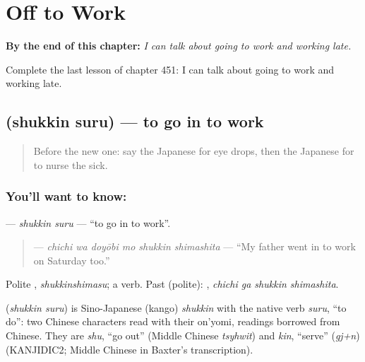 
\chapter{Off to Work}
\label{ch:ja-off-to-work}

\begin{chapteropening}
\textbf{By the end of this chapter:} \emph{I can talk about going to work and working late.}

Complete the last lesson of chapter 451: I can talk about going to work and working late.
\end{chapteropening}

\section[\texorpdfstring{\ja{しゅっきんする} (shukkin suru)}{しゅっきんする (shukkin suru)}]{ (shukkin suru) — to go in to work}

\label{lesson:JA-C451-shukkin-suru}



\begin{quote}
Before the new one: say the Japanese for eye drops, then the Japanese for to nurse the sick.
\end{quote}

\subsection*{You'll want to know: }
\textbf{} — \emph{shukkin suru} — \textquotedblleft{}to go in to work\textquotedblright{}.

\begin{quote}
\textbf{  } — \emph{chichi wa doyōbi mo shukkin shimashita} — \textquotedblleft{}My father went in to work on Saturday too.\textquotedblright{}
\end{quote}

Polite \textbf{}, \emph{shukkinshimasu}; a  verb. Past (polite): \textbf{ }, \emph{chichi ga shukkin shimashita}.

\begin{cousinweb}
\textbf{} (\emph{shukkin suru}) is Sino-Japanese (kango) \emph{shukkin} with the native verb \emph{suru}, \textquotedblleft{}to do\textquotedblright{}: two Chinese characters read with their on'yomi, readings borrowed from Chinese. They are \emph{shu}, \textquotedblleft{}go out\textquotedblright{} (Middle Chinese \emph{tsyhwit}) and \emph{kin}, \textquotedblleft{}serve\textquotedblright{} (\emph{gj+n}) (KANJIDIC2; Middle Chinese in Baxter's transcription).
\end{cousinweb}

